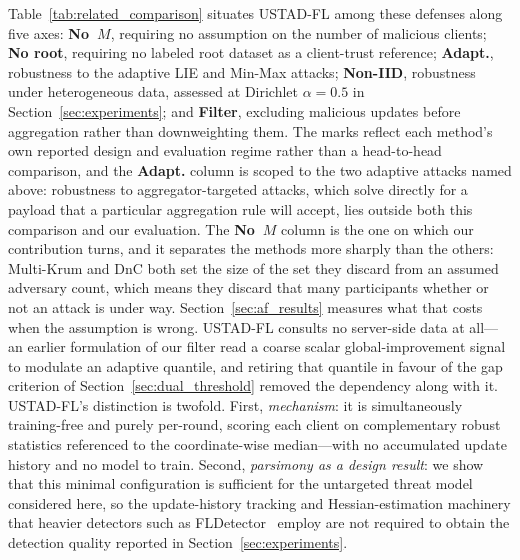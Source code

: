 \documentclass[journal]{IEEEtran}
\begin{document}
Table~\ref{tab:related_comparison} situates USTAD-FL among these defenses along five axes: \textbf{No~$M$}, requiring no assumption on the number of malicious clients; \textbf{No root}, requiring no labeled root dataset as a client-trust reference; \textbf{Adapt.}, robustness to the adaptive LIE and Min-Max attacks; \textbf{Non-IID}, robustness under heterogeneous data, assessed at Dirichlet $\alpha=0.5$ in Section~\ref{sec:experiments}; and \textbf{Filter}, excluding malicious updates before aggregation rather than downweighting them. The marks reflect each method's own reported design and evaluation regime rather than a head-to-head comparison, and the \textbf{Adapt.} column is scoped to the two adaptive attacks named above: robustness to aggregator-targeted attacks, which solve directly for a payload that a particular aggregation rule will accept, lies outside both this comparison and our evaluation. The \textbf{No~$M$} column is the one on which our contribution turns, and it separates the methods more sharply than the others: Multi-Krum and DnC both set the size of the set they discard from an assumed adversary count, which means they discard that many participants whether or not an attack is under way. Section~\ref{sec:af_results} measures what that costs when the assumption is wrong. USTAD-FL consults no server-side data at all---an earlier formulation of our filter read a coarse scalar global-improvement signal to modulate an adaptive quantile, and retiring that quantile in favour of the gap criterion of Section~\ref{sec:dual_threshold} removed the dependency along with it. USTAD-FL's distinction is twofold. First, \emph{mechanism}: it is simultaneously training-free and purely per-round, scoring each client on complementary robust statistics referenced to the coordinate-wise median---with no accumulated update history and no model to train. Second, \emph{parsimony as a design result}: we show that this minimal configuration is sufficient for the untargeted threat model considered here, so the update-history tracking and Hessian-estimation machinery that heavier detectors such as FLDetector~\cite{zhang2022fldetector} employ are not required to obtain the detection quality reported in Section~\ref{sec:experiments}.
\end{document}
